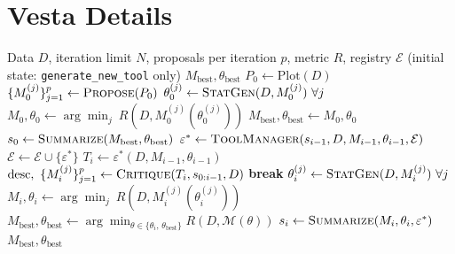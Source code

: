 \documentclass{article}
\newcommand{\method}{{\sc Vesta}}
\begin{document}




\newpage

\appendix

\section{\method{} Details}
\begin{algorithm}
\caption{Visual Exploration Agents (Detailed)}
\begin{algorithmic}[1]
\Require Data $D$, iteration limit $N$, proposals per iteration $p$, metric $R$, registry $\mathcal{E}$ (initial state: \texttt{generate\_new\_tool} only)
\Ensure $M_{\text{best}}, \theta_{\text{best}}$
\State $P_0 \gets \text{Plot}(D)$
\State $\{M_0^{(j)}\}_{j=1}^{p} \gets \textsc{Propose}(P_0)$ 
\State $\theta_0^{(j)} \gets \textsc{StatGen}(D, M_0^{(j)})\ \forall j$ 
\State $M_0, \theta_0 \gets \arg\min_{j}\ R(D, M_0^{(j)}(\theta_0^{(j)}))$ 
\State $M_{\text{best}}, \theta_{\text{best}} \gets M_0, \theta_0$
\State $s_0 \gets \textsc{Summarize}(M_{\text{best}}, \theta_{\text{best}})$
    \State $\varepsilon^* \gets \textsc{ToolManager}(s_{i-1}, D, M_{i-1}, \theta_{i-1}, \mathcal{E})$ 
    \State $\mathcal{E} \gets \mathcal{E} \cup \{\varepsilon^*\}$ 
    \State $T_i \gets \varepsilon^*(D, M_{i-1}, \theta_{i-1})$ 
    \State $\text{desc},\ \{M_i^{(j)}\}_{j=1}^{p} \gets \textsc{Critique}(T_i, s_{0:i-1}, D)$ 
        \State \textbf{break}
    \EndIf
    \State $\theta_i^{(j)} \gets \textsc{StatGen}(D, M_i^{(j)})\ \forall j$ 
    \State $M_i, \theta_i \gets \arg\min_{j}\ R(D, M_i^{(j)}(\theta_i^{(j)}))$ 
    \State $M_{\text{best}}, \theta_{\text{best}} \gets \arg\min_{\theta \in \{\theta_i,\, \theta_{\text{best}}\}} R(D, \mathcal{M}(\theta))$
    \State $s_i \gets \textsc{Summarize}(M_i, \theta_i, \varepsilon^*)$
\EndFor
\State \Return $M_{\text{best}}, \theta_{\text{best}}$
\end{algorithmic}
\label{alg:vea_details}
\end{algorithm}
\end{document}
